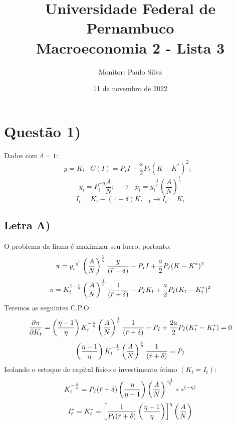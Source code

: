 \documentclass{article}
\title{Universidade Federal de Pernambuco \\
Macroeconomia 2 - Lista 3}
\author{Monitor: Paulo Silva}
\date{11 de novembro de 2022}
\begin{document}
\maketitle %

\section*{Questão 1)}
Dados com $\delta=1$:
$$y=K; \>\>\> 
C(I)=P_I I-\frac{a}{2}P_I(K-K^*)^2;\>\>\>
$$
$$y_i=P_i^{-\eta}\frac{A}{N}; \>\>\> \to  \>\>\> p_i=y_i^{\frac{-1}{\eta}}\left(\frac{A}{N}\right)^\frac{1}{\eta}$$
\begin{equation}\label{eq:1capital}
    I_t = K_t-(1-\delta)K_{t-1} \to I_t = K_t
\end{equation}

\subsection*{Letra A)}
O problema da firma é maximizar seu lucro, portanto:
\begin{equation}
    \pi = y_i^{\frac{-1}{\eta}}\left(\frac{A}{N}\right)^\frac{1}{\eta}\frac{y}{(\Bar{r}+\delta)} - P_I I+\frac{a}{2}P_I(K-K^*)^2
\end{equation}
\begin{equation}
    \pi = K_t^{1-\frac{1}{\eta}}\left(\frac{A}{N}\right)^\frac{1}{\eta}\frac{1}{(\Bar{r}+\delta)} - P_I K_t+\frac{a}{2}P_I(K_t-K_t^*)^2
\end{equation}
Teremos as seguintes C.P.O:
\begin{equation}
    \frac{\partial \pi}{\partial K_t} = \left(\frac{\eta -1}{\eta}\right)K_t^{-\frac{1}{\eta}}\left(\frac{A}{N}\right)^\frac{1}{\eta}\frac{1}{(\Bar{r}+\delta)}-P_I+\frac{2a}{2}P_I (K_t^*-K^*_t)=0
\end{equation}
\begin{equation}
    \left(\frac{\eta -1}{\eta}\right)K_t^{-\frac{1}{\eta}}\left(\frac{A}{N}\right)^\frac{1}{\eta}\frac{1}{(\Bar{r}+\delta)}=P_I
\end{equation}
Isolando o estoque de capital físico e investimento ótimo $(K_t = I_t)$:
\begin{equation}
    K_t^{-\frac{1}{\eta}}=P_I(\Bar{r}+\delta)\left(\frac{\eta}{\eta -1}\right)\left(\frac{A}{N}\right)^\frac{-1}{\eta} **^{(-\eta)}
\end{equation}
\begin{equation}
I_t^*=K_t^*=\left[\frac{1}{P_I(\Bar{r}+\delta)}\left(\frac{\eta -1}{\eta}\right)\right]^\eta\left(\frac{A}{N}\right)
\end{equation}
\end{document}
